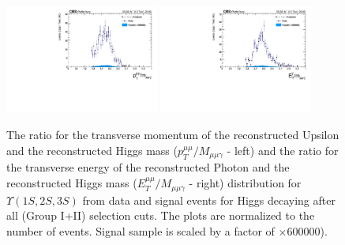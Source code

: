 \begin{figure}[!htbp]
\begin{center}
\includegraphics[width=0.45\textwidth]{figures/outputPlots/HtoUpsilon_Cat0_ZZZZZ/nEvts/data_x_mc/withKinCuts/h_withKin_upsilonPt_over_zMass}\hspace*{1.cm}
\includegraphics[width=0.45\textwidth]{figures/outputPlots/HtoUpsilon_Cat0_ZZZZZ/nEvts/data_x_mc/withKinCuts/h_withKin_photonPt_over_zMass}
\end{center}\vspace*{-.5cm}
\caption{The ratio for the transverse momentum of the reconstructed Upsilon and the reconstructed Higgs mass ($p_{T}^{\mu\mu}/M_{\mu\mu\gamma}$ - left) and the ratio for the transverse energy of the reconstructed Photon and the reconstructed Higgs mass ($E_{T}^{\mu\mu}/M_{\mu\mu\gamma}$ - right) distribution for $\Upsilon(1S,2S,3S)$ from data and signal events for Higgs decaying after all (Group I+II) selection cuts. The plots are normalized to the number of events. Signal sample is scaled by a factor of $\times 600000$).}
\label{fig:energy_ration_HtoUpsilon_Cat0_groupI_plus_II}
\end{figure}


